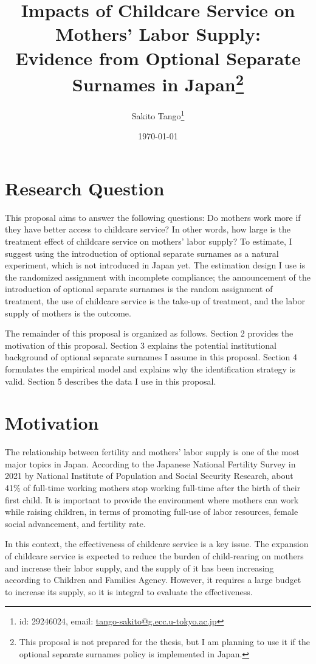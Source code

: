 \documentclass[12pt]{article}
\title{Impacts of Childcare Service on Mothers' Labor Supply: \\ 
       Evidence from Optional Separate Surnames in Japan\thanks{
        This proposal is not prepared for the thesis, but I am planning to use it if the optional separate surnames policy is implemented in Japan.
       }
       }
\author{Sakito Tango\thanks{id: 29246024, 
        email: \href{mailto:tango-sakito@g.ecc.u-tokyo.ac.jp}{tango-sakito@g.ecc.u-tokyo.ac.jp}
}
}
\date{\today}
\begin{document}
\maketitle

\section{Research Question}
This proposal aims to answer the following questions: Do mothers work more if they have better access to childcare service? 
In other words, how large is the treatment effect of childcare service on mothers' labor supply?
To estimate, I suggest using the introduction of optional separate surnames as a natural experiment, which is not introduced in Japan yet.
The estimation design I use is the randomized assignment with incomplete compliance; the announcement of the introduction of optional separate surnames is the random assignment of treatment, the use of childcare service is the take-up of treatment, and the labor supply of mothers is the outcome.


The remainder of this proposal is organized as follows. 
Section 2 provides the motivation of this proposal. 
Section 3 explains the potential institutional background of optional separate surnames I assume in this proposal.
Section 4 formulates the empirical model and explains why the identification strategy is valid.
Section 5 describes the data I use in this proposal.


\section{Motivation}
The relationship between fertility and mothers' labor supply is one of the most major topics in Japan. 
According to the Japanese National Fertility Survey in 2021 by National Institute of Population and Social Security Research, about 41\% of full-time working mothers stop working full-time after the birth of their first child.
It is important to provide the environment where mothers can work while raising children, in terms of promoting full-use of labor resources, female social advancement, and fertility rate.


In this context, the effectiveness of childcare service is a key issue. 
The expansion of childcare service is expected to reduce the burden of child-rearing on mothers and increase their labor supply, and the supply of it has been increasing according to Children and Families Agency. 
However, it requires a large budget to increase its supply, so it is integral to evaluate the effectiveness.
\end{document}
